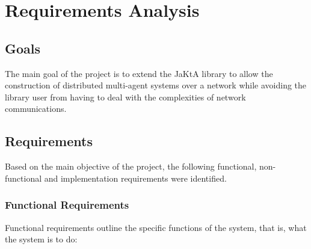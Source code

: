 \section{Requirements Analysis}

%
%

%

\subsection{Goals}

The main goal of the project is to extend the JaKtA library to allow the construction of distributed multi-agent systems
over a network while avoiding the library user from having to deal with the complexities of network communications.

\subsection{Requirements}
Based on the main objective of the project, the following functional, non-functional and implementation requirements were identified.

\subsubsection{Functional Requirements}
Functional requirements outline the specific functions of the system, that is, what the system is to do:


